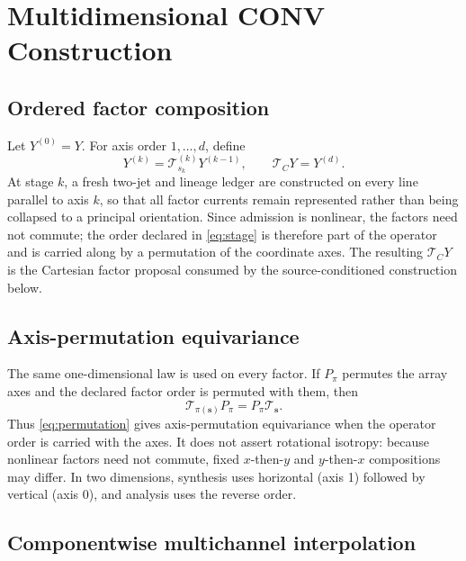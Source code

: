 \documentclass[journal]{IEEEtran}
\newcommand{\Tcal}{\mathcal{T}}
\begin{document}
\section{Multidimensional CONV Construction}

\subsection{Ordered factor composition}

Let \(Y^{(0)}=Y\). For axis order \(1,\ldots,d\), define
\begin{equation}
 Y^{(k)}=\Tcal_{s_k}^{(k)}Y^{(k-1)},\qquad
 \Tcal_CY=Y^{(d)}.
 \label{eq:stage}
\end{equation}
At stage \(k\), a fresh two-jet and lineage ledger are constructed on every
line parallel to axis \(k\), so that all factor currents remain represented
rather than being collapsed to a principal orientation. Since admission is
nonlinear, the factors need not commute; the order declared in
\eqref{eq:stage} is therefore part of the operator and is carried along by a
permutation of the coordinate axes. The resulting \(\Tcal_CY\) is the
Cartesian factor proposal consumed by the source-conditioned construction
below.

\subsection{Axis-permutation equivariance}

The same one-dimensional law is used on every factor. If \(P_\pi\) permutes
the array axes and the declared factor order is permuted with them, then
\begin{equation}
 \Tcal_{\pi(\bm s)}P_\pi=P_\pi\Tcal_{\bm s}.
 \label{eq:permutation}
\end{equation}
Thus \eqref{eq:permutation} gives axis-permutation equivariance when the
operator order is carried with the axes. It does not assert rotational
isotropy: because nonlinear factors need not commute, fixed
\(x\)-then-\(y\) and \(y\)-then-\(x\) compositions may differ. In two
dimensions, synthesis uses horizontal (axis 1) followed by vertical (axis
0), and analysis uses the reverse order.



\subsection{Componentwise multichannel interpolation}
\end{document}
